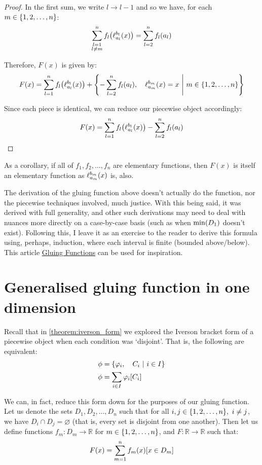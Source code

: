 \begin{proof}
    In the first sum, we write $l\to l-1$ and so we have, for each $m\in\{1,2,\dots,n\}$:
    $$
        \sum_{\substack{l=1\\l\neq m}}^{n}{f_l\paren*{\ell_{a_l}^{b_l}\paren{x}}} = \sum_{l=2}^{n}{f_{l}\paren*{a_{l}}}
    $$

    Therefore, $F(x)$ is given by:
    $$
        F(x) = \sum_{l=1}^{n}{f_l\paren*{\ell_{a_l}^{b_l}\paren{x}}}+\pwobj{-\sum_{l=2}^{n}{f_{l}\paren*{a_{l}}}}{\ell_{a_m}^{b_m}\paren{x}=x}{m\in\br{1,2,\dots,n}}
    $$

    Since each piece is identical, we can reduce our piecewise object accordingly:
    $$
        F(x) = \sum_{l=1}^{n}{f_l\paren*{\ell_{a_l}^{b_l}\paren{x}}}-\sum_{l=2}^{n}{f_{l}\paren*{a_{l}}}
    $$
\end{proof}

As a corollary, if all of $f_1,f_2,\dots,f_n$ are elementary functions, then $F(x)$ is itself an elementary function as $\ell_{a_m}^{b_m}(x)$ is, also.

The derivation of the gluing function above doesn't actually do the function, nor the piecewise techniques involved, much justice. With this being said, it was derived with full generality, and other such derivations may need to deal with nuances more directly on a case-by-case basis (such as when $\min(D_1)$ doesn't exist). Following this, I leave it as an exercise to the reader to derive this formula using, perhaps, induction, where each interval is finite (bounded above/below). This article \href{https://piecewise.org/exploration/gluing-functions}{Gluing Functions} can be used for inspiration.

\section{Generalised gluing function in one dimension}
Recall that in \ref{theorem:iverson_form} we explored the Iverson bracket form of a piecewise object when each condition was `disjoint'. That is, the following are equivalent:
\begin{align*}
    \phi &= \left\{\varphi_i,\quad C_i\ \middle|\ i\in I\right\} \\
    \phi &= \sum_{i\in I}{\varphi_i[C_i]}
\end{align*}

We can, in fact, reduce this form down for the purposes of our gluing function. Let us denote the sets $D_1,D_2,\dots,D_n$ such that for all $i,j\in\br{1,2,\dots,n},\ i\neq j$, we have $D_i\cap D_j=\varnothing$ (that is, every set is disjoint from one another). Then let us define functions $f_m:D_m\to\mathbb{R}$ for $m\in\{1,2,\dots,n\}$, and $F:\mathbb{R}\to\mathbb{R}$ such that:
$$
    F(x) = \sum_{m=1}^{n}{f_m(x)[x\in D_m]}
$$

